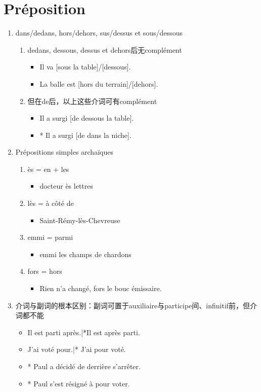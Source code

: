 \documentclass[UTF8]{report}
\begin{document}
\chapter{Préposition}

\begin{enumerate}
    \item dans/dedans, hors/dehors, sus/dessus et sous/dessous
    \begin{enumerate}
        \item dedans, dessous, dessus et dehors后无complément
        \begin{itemize}
            \item Il va [sous la table]/[dessous].
            \item La balle est [hors du terrain]/[dehors].
        \end{itemize}
        \item 但在de后，以上这些介词可有complément
        \begin{itemize}
            \item Il a surgi [de dessous la table].
            \item * Il a surgi [de dans la niche].
        \end{itemize}
    \end{enumerate}
    \item Prépositions simples archaïques
    \begin{enumerate}
        \item ès = en + les
        \begin{itemize}
            \item docteur ès lettres
        \end{itemize}
        \item lès = à côté de
        \begin{itemize}
            \item Saint-Rémy-lès-Chevreuse
        \end{itemize}
        \item emmi = parmi
        \begin{itemize}
            \item emmi les champs de chardons
        \end{itemize}
        \item fors = hors
        \begin{itemize}
            \item Rien n’a changé, fors le bouc émissaire.
        \end{itemize}
    \end{enumerate}
    \item 介词与副词的根本区别：副词可置于auxiliaire与participe间、infinitif前，但介词都不能
    \begin{itemize}
        \item Il est parti après.|*Il est après parti.
        \item J’ai voté pour.|* J’ai pour voté.
        \item * Paul a décidé de derrière s’arrêter.
        \item * Paul s’est résigné à pour voter.
    \end{itemize}
\end{enumerate}
\end{document}
